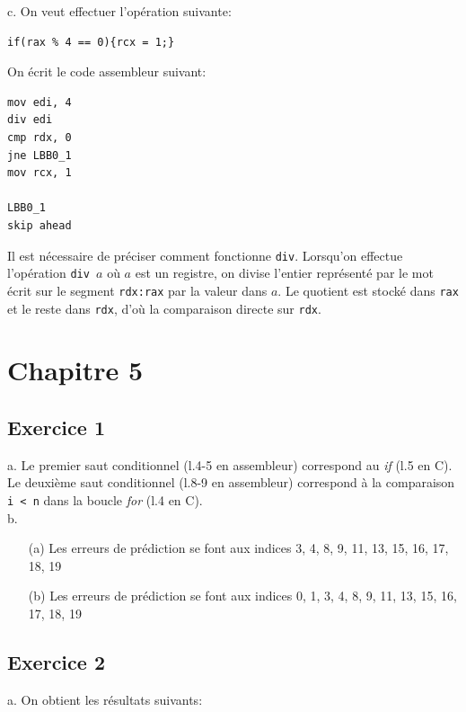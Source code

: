 \documentclass[11pt, a4 paper]{article}
\begin{document}
c. On veut effectuer l'opération suivante:
\begin{lstlisting}[style=CStyle]
if(rax % 4 == 0){rcx = 1;}
\end{lstlisting}

On écrit le code assembleur suivant:
\begin{lstlisting}[style=customasm]
mov edi, 4
div edi
cmp rdx, 0
jne LBB0_1
mov rcx, 1

LBB0_1
skip ahead
\end{lstlisting}
Il est nécessaire de préciser comment fonctionne \texttt{div}.
Lorsqu'on effectue l'opération \texttt{div $a$} où $a$ est un registre, on divise l'entier représenté par le mot écrit sur le segment \texttt{rdx:rax} par la valeur dans $a$. Le quotient est stocké dans \texttt{rax} et le reste dans \texttt{rdx}, d'où la comparaison directe sur \texttt{rdx}.

\pagebreak
\section{Chapitre 5}
\subsection{Exercice 1}
a. Le premier saut conditionnel (l.4-5 en assembleur) correspond au \textit{if} (l.5 en C).\\
Le deuxième saut conditionnel (l.8-9 en assembleur) correspond à la comparaison \texttt{i < n} dans la boucle \textit{for} (l.4 en C).\\

b. \begin{itemize}
    \item[(a)] Les erreurs de prédiction se font aux indices 3, 4, 8, 9, 11, 13, 15, 16, 17, 18, 19
    \item[(b)] Les erreurs de prédiction se font aux indices 0, 1, 3, 4, 8, 9, 11, 13, 15, 16, 17, 18, 19
\end{itemize}

\subsection{Exercice 2}
a. On obtient les résultats suivants:
\begin{figure}[!h]
\end{figure}
\end{document}
